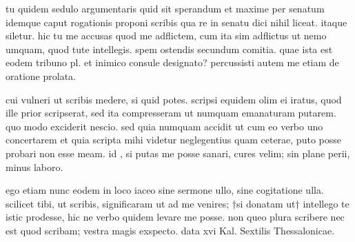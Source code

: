 


 tu quidem sedulo argumentaris quid sit sperandum et maxime per senatum idemque caput rogationis proponi scribis qua re in senatu dici nihil liceat. itaque siletur. hic tu me accusas quod me adflictem, cum ita sim adflictus ut nemo umquam, quod tute intellegis. spem ostendis secundum comitia. quae ista est eodem tribuno pl. et inimico consule designato? percussisti autem me etiam de oratione prolata.

 cui vulneri ut scribis medere, si quid potes. scripsi equidem olim ei iratus, quod ille prior scripserat, sed ita compresseram ut numquam emanaturam putarem. quo modo exciderit nescio. sed quia numquam accidit ut cum eo verbo uno concertarem et quia scripta mihi videtur neglegentius quam ceterae, puto posse probari non esse meam. id , si putas me posse sanari, cures velim; sin plane perii, minus laboro.

 ego etiam nunc eodem in loco iaceo sine sermone ullo, sine cogitatione ulla. scilicet tibi, ut scribis, significaram ut ad me venires; †si donatam ut† intellego te istic prodesse, hic ne verbo quidem levare me posse. non queo plura scribere nec est quod scribam; vestra magis exspecto. data xvi Kal. Sextilis Thessalonicae.
